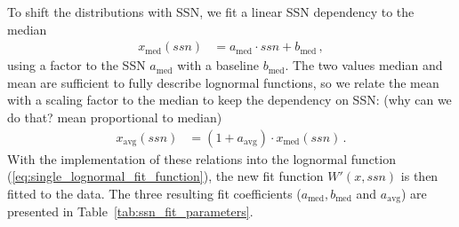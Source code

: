 To shift the distributions with SSN, we fit a linear SSN dependency to the median
\begin{align}
	x_\text{med}(ssn) &= a_\text{med} \cdot ssn + b_\text{med}\,,	\label{eq:median_with_ssn}
\end{align}
using a factor to the SSN $a_\text{med}$ with a baseline $b_\text{med}$. The two values median and mean are sufficient to fully describe lognormal functions, so we relate the mean with a scaling factor to the median to keep the dependency on SSN: (why can we do that? mean proportional to median)
\begin{align}
	x_\text{avg}(ssn) &= (1 + a_\text{avg}) \cdot x_\text{med}(ssn)\,.	\label{eq:mean_with_ssn}
\end{align}
With the implementation of these relations into the lognormal function (\ref{eq:single_lognormal_fit_function}), the new fit function $W'(x,ssn)$ is then fitted to the data. The three resulting fit coefficients ($a_\text{med}, b_\text{med}$ and $a_\text{avg}$) are presented in Table~\ref{tab:ssn_fit_parameters}.\\

